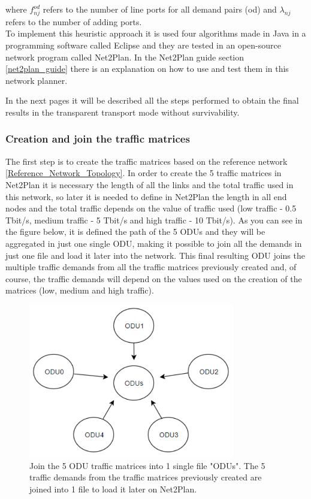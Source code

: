 \noindent
where $f_{nj}^{od}$ refers to the number of line ports for all demand pairs (od) and $\lambda_{nj}$ refers to the number of adding ports.\\

\vspace{11pt}
To implement this heuristic approach it is used four algorithms made in Java in a programming software called Eclipse and they are tested in an open-source network program called Net2Plan. In the Net2Plan guide section \ref{net2plan_guide} there is an explanation on how to use and test them in this network planner.

In the next pages it will be described all the steps performed to obtain the final results in the transparent transport mode without survivability.

\newpage
\subsubsection{Creation and join the traffic matrices}

\noindent
The first step is to create the traffic matrices based on the reference network \ref{Reference_Network_Topology}. In order to create the 5 traffic matrices in Net2Plan it is necessary the length of all the links and the total traffic used in this network, so later it is needed to define in Net2Plan the length in all end nodes and the total traffic depends on the value of traffic used (low traffic - 0.5 Tbit/s, medium traffic - 5 Tbit/s and high traffic - 10 Tbit/s). As you can see in the figure below, it is defined the path of the 5 ODUs and they will be aggregated in just one single ODU, making it possible to join all the demands in just one file and load it later into the network. This final resulting ODU joins the multiple traffic demands from all the traffic matrices previously created and, of course, the traffic demands will depend on the values used on the creation of the matrices (low, medium and high traffic).

\begin{figure}[H]
\centering
\includegraphics[width=9cm]{sdf/heuristic/transparent_survivability/figures/join_matrices_odus}
\caption{Join the 5 ODU traffic matrices into 1 single file "ODUs". The 5 traffic demands from the traffic matrices previously created are joined into 1 file to load it later on Net2Plan.}
\label{join_matrices_odus}
\end{figure}

